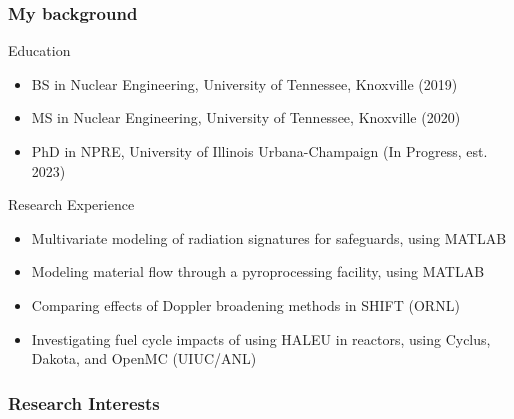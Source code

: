 \begin{frame}
    \frametitle{My background}
    Education 
    \begin{itemize}
        \item BS in Nuclear Engineering, University of Tennessee, Knoxville (2019)
        \item MS in Nuclear Engineering, University of Tennessee, Knoxville (2020)
        \item PhD in NPRE, University of Illinois Urbana-Champaign (In Progress, est. 2023)
    \end{itemize}
    Research Experience
    \begin{itemize}
        \item Multivariate modeling of radiation signatures for safeguards, using MATLAB
        \item Modeling material flow through a pyroprocessing facility, using MATLAB
        \item Comparing effects of Doppler broadening methods in SHIFT (ORNL)
        \item Investigating fuel cycle impacts of using \gls{HALEU} in reactors,
              using Cyclus, Dakota, and OpenMC (UIUC/ANL)
    \end{itemize}

\end{frame}

\begin{frame}
    \frametitle{Research Interests}
    
\end{frame}